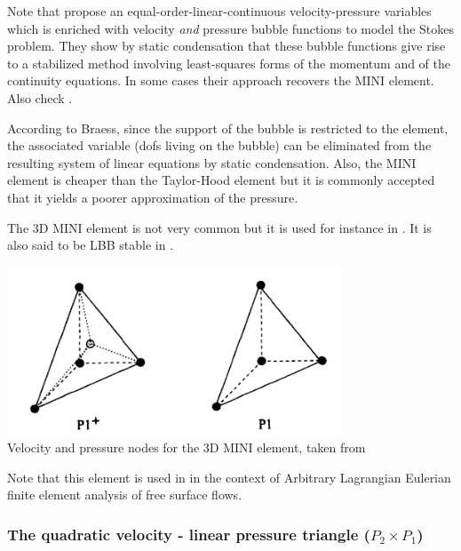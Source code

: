 \begin{remark}
Note that \cite{frol03} propose an equal-order-linear-continuous velocity-pressure variables which is enriched 
with velocity {\it and} pressure bubble functions to model the Stokes problem. They show by static condensation that
these bubble functions give rise to a stabilized method involving least-squares forms of the momentum and of the
continuity equations. In some cases their approach recovers the MINI element. Also check \cite{gamt08}.
\end{remark}

\begin{remark}
According to Braess\cite{braess}, since the support of the bubble is restricted to the element, 
the associated variable (dofs living on the bubble) can be eliminated from the resulting 
system of linear equations by static condensation. 
Also, the MINI element is cheaper than the Taylor-Hood element but it is commonly accepted
that it yields a poorer approximation of the pressure.
\end{remark}

The 3D MINI element is not very common but it is used for instance in \cite{pico98}.
It is also said to be LBB stable in \cite[p180]{reddybook2}.

\begin{center}
\includegraphics[width=10cm]{images/mini/mini3D}\\
{\captionfont Velocity and pressure nodes for the 3D MINI element, taken from \cite{pico98}}
\end{center}

Note that this element is used in \cite{brwr00} in the context of Arbitrary Lagrangian Eulerian 
finite element analysis of free surface flows.








\subsubsection{The quadratic velocity - linear pressure triangle ($P_2\times P_1$)}

